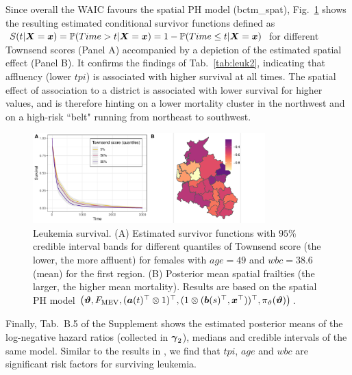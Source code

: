\documentclass[12pt]{article}
\theoremstyle{plain}
\newcommand{\bctm}[2]{\big( \varthetavec, \allowbreak {#1},\allowbreak {#2}, \allowbreak\pi_\vartheta(\varthetavec)\big)}
\begin{document}
Since overall the WAIC favours the spatial PH model  (bctm\_spat), Fig.~\ref{fig:leuk_plot1} shows the resulting estimated conditional survivor functions defined as $S(t|\text{\boldmath$X$}=\text{\boldmath$x$}) = \mathbb{P}(Time>t|\text{\boldmath$X$}=\text{\boldmath$x$}) = 1-\mathbb{P}(Time \leq t |\text{\boldmath$X$}=\text{\boldmath$x$})$
for different Townsend scores (Panel A) accompanied by a depiction of the estimated spatial effect (Panel B). It confirms the findings of Tab.~\ref{tab:leuk2}, indicating that affluency (lower $tpi$) is associated with higher survival at all times. The spatial effect of association to a district is associated with lower survival for higher values, and is therefore hinting on a lower mortality cluster in the northwest and on a high-risk ``belt" running from northeast to southwest. 
\begin{figure}
\centering
   \hspace*{-1.5cm}\includegraphics[width=0.8\textwidth]{figs/leuk_ph.pdf}\caption{\small Leukemia survival. (A) Estimated survivor functions with $95\%$ credible interval bands for different quantiles of Townsend score (the lower, the more affluent) for females with $\mathit{age}=49$ and $\mathit{wbc}=38.6$(mean) for the first region. (B) Posterior mean spatial frailties (the larger, the higher mean mortality). Results are based on the spatial PH model $\bctm{F_{\text{MEV}}}{(\avec(t)^\top \otimes 1)^\top, (1 \otimes (\bvec(s)^\top, \xvec^\top))^\top}$.}\label{fig:leuk_plot1}
\end{figure}
Finally, Tab.~B.5 of the Supplement shows the estimated posterior means of the log-negative hazard ratios (collected in $\text{\boldmath$\gamma$}_2$), medians and credible intervals of the same model. Similar to the results in \cite{spbayessurv}, we find that $\mathit{tpi}$, $\mathit{age}$ and $\mathit{wbc}$ are significant risk factors for surviving leukemia. 
\end{document}
